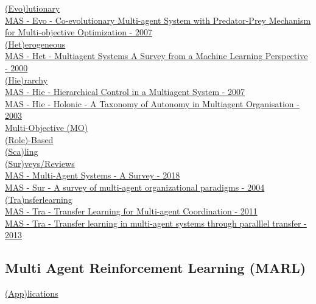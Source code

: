 \underline{(Evo)lutionary}
\\
\href{https://link.springer.com/chapter/10.1007/978-3-540-71618-1_8}{MAS - Evo - Co-evolutionary Multi-agent System with Predator-Prey Mechanism for Multi-objective Optimization - 2007}
\\

\underline{(Het)erogeneous}
\\
\href{https://link.springer.com/article/10.1023/A:1008942012299}{MAS - Het - Multiagent Systems A Survey from a Machine Learning Perspective - 2000}
\\

\underline{(Hie)rarchy}
\\
\href{https://ieeexplore.ieee.org/abstract/document/4427756}{MAS - Hie - Hierarchical Control in a Multiagent System - 2007}
\\
\href{https://link.springer.com/chapter/10.1007/978-3-540-25928-2_6}{MAS - Hie - Holonic - A Taxonomy of Autonomy in Multiagent Organisation - 2003}
\\

\underline{Multi-Objective (MO)}
\\

\underline{(Role)-Based}
\\

\underline{(Sca)ling}
\\

\underline{(Sur)veys/Reviews}
\\
\href{https://ieeexplore.ieee.org/abstract/document/8352646}{MAS - Multi-Agent Systems - A Survey - 2018}
\\
\href{https://dl.acm.org/doi/abs/10.1017/S0269888905000317}{MAS - Sur - A survey of multi-agent organizational paradigms - 2004}
\\

\underline{(Tra)nsferlearning}
\\
\href{https://www.scitepress.org/Papers/2011/31856/}{MAS - Tra - Transfer Learning for Multi-agent Coordination - 2011}
\\
\href{https://ulir.ul.ie/handle/10344/3305}{MAS - Tra - Transfer learning in multi-agent systems through paralllel transfer - 2013}
\\


\subsection{Multi Agent Reinforcement Learning (MARL)}
\underline{(App)lications}
\\


